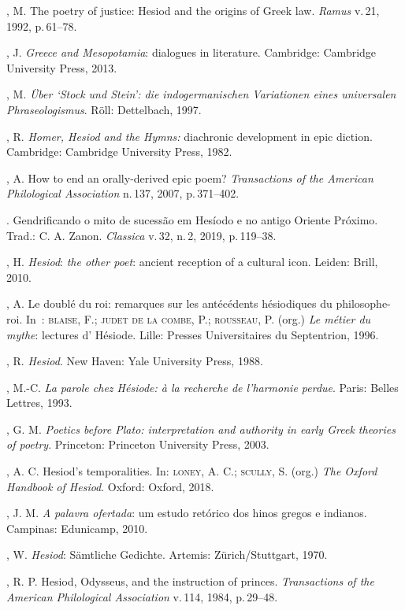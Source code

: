 \begin{bibliohedra}
, M. The poetry of justice: Hesiod and the origins of Greek law.
\textit{Ramus} v.\,21, 1992, p.\,61--78.

, J. \textit{Greece and Mesopotamia}: dialogues in literature.
Cambridge: Cambridge University Press, 2013.

, M. \textit{Über `Stock und Stein': die indogermanischen Variationen
eines universalen Phraseologismus}. Röll: Dettelbach, 1997.

, R. \textit{Homer, Hesiod and the Hymns:} diachronic development in
epic diction. Cambridge: Cambridge University Press, 1982.

, A. How to end an orally-derived epic poem? \textit{Transactions of
the American Philological Association} n.\,137, 2007, p.\,371--402.

\titidem. Gendrificando o mito de sucessão em Hesíodo e no antigo Oriente
Próximo. Trad.: C. A. Zanon. \textit{Classica} v.\,32, n.\,2, 2019, p.\,119--38.

, H. \textit{Hesiod}: \textit{the other poet}: ancient reception of a
cultural icon. Leiden: Brill, 2010.

, A. Le doublé du roi: remarques sur les antécédents hésiodiques du
philosophe-roi. In~: \textsc{blaise}, F.; \textsc{judet de la combe}, P.; \textsc{rousseau}, P.
(org.) \textit{Le métier du mythe}: lectures d' Hésiode. Lille: Presses
Universitaires du Septentrion, 1996.

, R. \textit{Hesiod}. New Haven: Yale University Press, 1988.

, M.-C. \textit{La parole chez Hésiode: à la recherche de
l'harmonie perdue}. Paris: Belles Lettres, 1993.

, G. M. \textit{Poetics before Plato: interpretation and
authority in early Greek theories of poetry}. Princeton: Princeton
University Press, 2003.

, A. C. Hesiod's temporalities. In: \textsc{loney}, A. C.; \textsc{scully}, S. (org.)
\textit{The Oxford Handbook of Hesiod}. Oxford: Oxford, 2018.

, J. M. \textit{A palavra ofertada}: um estudo retórico dos hinos
gregos e indianos. Campinas: Edunicamp, 2010.

, W. \textit{Hesiod}: Sämtliche Gedichte. Artemis: Zürich/Stuttgart,
1970.

, R. P. Hesiod, Odysseus, and the instruction of princes.
\textit{Transactions of the American Philological Association} v.\,114,
1984, p.\,29--48.


\end{bibliohedra}
